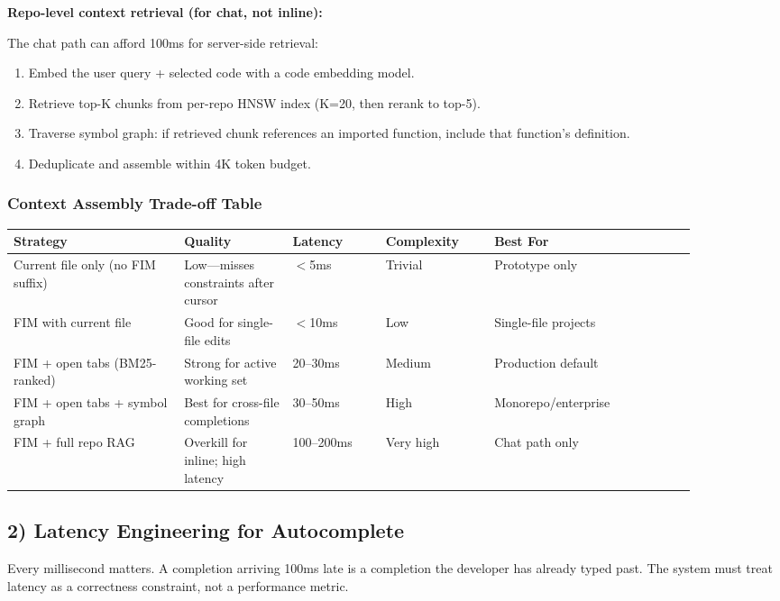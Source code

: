\textbf{Repo-level context retrieval (for chat, not inline):}

The chat path can afford 100ms for server-side retrieval:
\begin{enumerate}
  \item Embed the user query + selected code with a code embedding model.
  \item Retrieve top-K chunks from per-repo HNSW index (K=20, then rerank to top-5).
  \item Traverse symbol graph: if retrieved chunk references an imported function, include that function's definition.
  \item Deduplicate and assemble within 4K token budget.
\end{enumerate}

\subsubsection*{Context Assembly Trade-off Table}

\begin{tabular}{|p{0.22\linewidth}|p{0.14\linewidth}|p{0.12\linewidth}|p{0.14\linewidth}|p{0.26\linewidth}|}
\hline
\textbf{Strategy} & \textbf{Quality} & \textbf{Latency} & \textbf{Complexity} & \textbf{Best For} \\
\hline
Current file only (no FIM suffix) & Low---misses constraints after cursor & $<$5ms & Trivial & Prototype only \\
\hline
FIM with current file & Good for single-file edits & $<$10ms & Low & Single-file projects \\
\hline
FIM + open tabs (BM25-ranked) & Strong for active working set & 20--30ms & Medium & Production default \\
\hline
FIM + open tabs + symbol graph & Best for cross-file completions & 30--50ms & High & Monorepo/enterprise \\
\hline
FIM + full repo RAG & Overkill for inline; high latency & 100--200ms & Very high & Chat path only \\
\hline
\end{tabular}

\subsection*{2) Latency Engineering for Autocomplete}

Every millisecond matters. A completion arriving 100ms late is a completion the developer has already typed past. The system must treat latency as a correctness constraint, not a performance metric.

